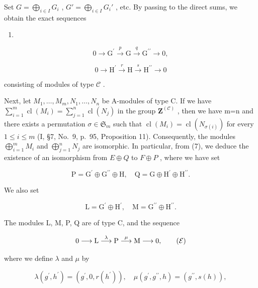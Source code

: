 Set \(G = \bigoplus_{i \in I} G_i\) , \(G' = \bigoplus_{i \in I} G_i'\) , etc. By passing to the direct sums, we obtain the exact sequences

\begin{enumerate}
\def\labelenumi{(\Alph{enumi})}
\setcounter{enumi}{6}
\tightlist
\item
\end{enumerate}

\[
0 \longrightarrow \mathrm{G} ^ {\prime} \stackrel {p} {\longrightarrow} \mathrm{G} \stackrel {q} {\longrightarrow} \mathrm{G} ^ {\prime \prime} \longrightarrow 0,\tag{H}
\]

\[
0 \longrightarrow \mathrm{H} ^ {\prime} \stackrel {r} {\longrightarrow} \mathrm{H} \stackrel {s} {\longrightarrow} \mathrm{H} ^ {\prime \prime} \longrightarrow 0
\]

consisting of modules of type \(\mathcal{C}\) .

Next, let \(M_{1},\ldots,M_{m},N_{1},\ldots,N_{n}\) be A-modules of type C. If we have \(\sum_{i=1}^{m}\operatorname{cl}(M_{i})=\sum_{j=1}^{n}\operatorname{cl}(N_{j})\) in the group \(\mathbf{Z}^{(\mathcal{C})}\) , then we have m=n and there exists a permutation \(\sigma\in\mathfrak{S}_{m}\) such that \(\operatorname{cl}(M_{i})=\operatorname{cl}(N_{\sigma(i)})\) for every \(1\leqslant i\leqslant m\) (I, §7, No.~9, p.~95, Proposition 11). Consequently, the modules \(\bigoplus_{i=1}^{m}M_{i}\) and \(\bigoplus_{j=1}^{n}N_{j}\) are isomorphic. In particular, from (7), we deduce the existence of an isomorphism from \(E\oplus Q\) to \(F\oplus P\) , where we have set

\[
\mathrm{P} = \mathrm{G} ^ {\prime} \oplus \mathrm{G} ^ {\prime \prime} \oplus \mathrm{H}, \quad \mathrm{Q} = \mathrm{G} \oplus \mathrm{H} ^ {\prime} \oplus \mathrm{H} ^ {\prime \prime}.
\]

We also set

\[
\mathrm{L} = \mathrm{G} ^ {\prime} \oplus \mathrm{H} ^ {\prime}, \quad \mathrm{M} = \mathrm{G} ^ {\prime \prime} \oplus \mathrm{H} ^ {\prime \prime}.
\]

The modules L, M, P, Q are of type C, and the sequence

\[
0 \longrightarrow \mathrm{L} \stackrel {\lambda} {\longrightarrow} \mathrm{P} \stackrel {\mu} {\longrightarrow} \mathrm{M} \longrightarrow 0,\tag{\( \mathcal{E} \)}
\]

where we define \(\lambda\) and \(\mu\) by

\[
\lambda (g ^ {\prime}, h ^ {\prime}) = \left(g ^ {\prime}, 0, r (h ^ {\prime})\right), \quad \mu (g ^ {\prime}, g ^ {\prime \prime}, h) = \left(g ^ {\prime \prime}, s (h)\right),
\]

